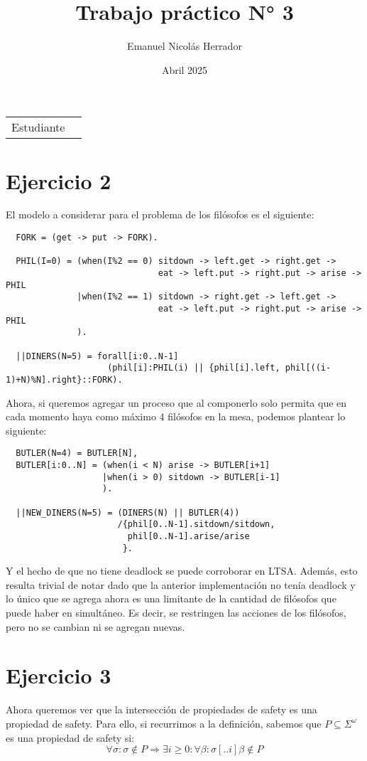 \documentclass{article}
\title{Trabajo práctico N° 3}
\author{Emanuel Nicolás Herrador}
\date{Abril 2025}
\begin{document}
\maketitle

\noindent\begin{tabular}{@{}ll}
	Estudiante & \theauthor \\
\end{tabular}

\section*{Ejercicio 2}
El modelo a considerar para el problema de los filósofos es el siguiente:
\begin{verbatim}
  FORK = (get -> put -> FORK).

  PHIL(I=0) = (when(I%2 == 0) sitdown -> left.get -> right.get ->
                              eat -> left.put -> right.put -> arise -> PHIL
              |when(I%2 == 1) sitdown -> right.get -> left.get ->
                              eat -> left.put -> right.put -> arise -> PHIL 
              ).

  ||DINERS(N=5) = forall[i:0..N-1]
                    (phil[i]:PHIL(i) || {phil[i].left, phil[((i-1)+N)%N].right}::FORK).
\end{verbatim}

Ahora, si queremos agregar un proceso que al componerlo solo permita que en cada momento haya como máximo 4 filósofos en la mesa, podemos plantear lo siguiente:
\begin{verbatim}
  BUTLER(N=4) = BUTLER[N],
  BUTLER[i:0..N] = (when(i < N) arise -> BUTLER[i+1]
                   |when(i > 0) sitdown -> BUTLER[i-1]
                   ).

  ||NEW_DINERS(N=5) = (DINERS(N) || BUTLER(4))
                      /{phil[0..N-1].sitdown/sitdown,
                        phil[0..N-1].arise/arise
                       }.
\end{verbatim}

Y el hecho de que no tiene deadlock se puede corroborar en LTSA.
Además, esto resulta trivial de notar dado que la anterior implementación no tenía deadlock y lo único que se agrega ahora es una limitante de la cantidad de filósofos que puede haber en simultáneo.
Es decir, se restringen las acciones de los filósofos, pero no se cambian ni se agregan nuevas.

\section*{Ejercicio 3}
Ahora queremos ver que la intersección de propiedades de safety es una propiedad de safety.
Para ello, si recurrimos a la definición, sabemos que $P \subseteq \Sigma^\omega$ es una propiedad de safety si:
\begin{equation}
	\tag{3.1}
	\forall \sigma : \sigma \notin P \Rightarrow \exists i \geq 0 : \forall \beta : \sigma[..i]\beta \notin P
\end{equation}
\end{document}
